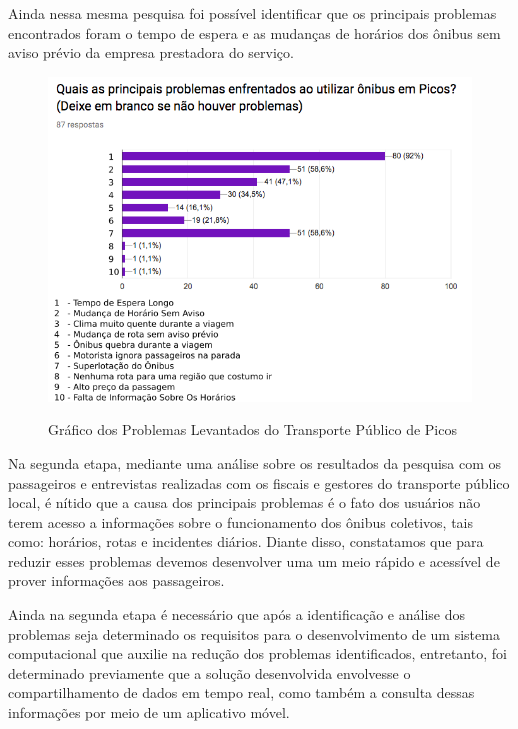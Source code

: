 Ainda nessa mesma pesquisa foi possível identificar que os principais problemas encontrados foram o tempo de espera e as mudanças de horários dos ônibus sem aviso prévio da empresa prestadora do serviço.

\begin{figure}[H]
\caption{Gráfico dos Problemas Levantados do Transporte Público de Picos}
\centering
\includegraphics[width=1.0\textwidth]{imagens/problema.png}
\label{fig:problema}
\end{figure}

Na segunda etapa, mediante uma análise sobre os resultados da pesquisa com os passageiros e entrevistas realizadas com os fiscais e gestores do transporte público local, é nítido que a causa dos principais problemas é o fato dos usuários não terem acesso a informações sobre o funcionamento dos ônibus coletivos, tais como: horários, rotas e incidentes diários. Diante disso, constatamos que para reduzir esses problemas devemos desenvolver uma um meio rápido e acessível de prover informações aos passageiros.

Ainda na segunda etapa é necessário que após a identificação e análise dos problemas seja determinado os requisitos para o desenvolvimento de um sistema computacional que auxilie na redução dos problemas identificados, entretanto, foi determinado previamente que a solução desenvolvida envolvesse o compartilhamento de dados em tempo real, como também a consulta dessas informações por meio de um aplicativo móvel.

